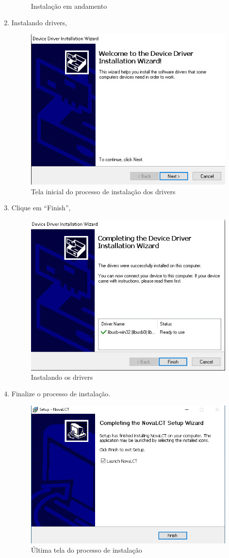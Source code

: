 \documentclass[12pt, a4paper]{article}
\begin{document}
\begin{enumerate}
\begin{figure}[!htb]
			\caption{Instalação em andamento}
		\end{figure}
		\newpage
	\item Instalando drivers,
		\begin{figure}[!htb]
			\centering
			\includegraphics[width=.75\textwidth]{D8.jpeg}
			\caption{Tela inicial do processo de instalação dos drivers}
		\end{figure}
	\item Clique em ``Finish'',
		\begin{figure}[!htb]
			\centering
			\includegraphics[width=.75\textwidth]{D9.jpeg}
			\caption{Instalando os drivers}
		\end{figure}
		\newpage
	\item Finalize o processo de instalação.
		\begin{figure}[!htb]
			\centering
			\includegraphics[width=.8\textwidth]{DEnd.jpeg}
			\caption{Última tela do processo de instalação}
		\end{figure}
\end{enumerate}
\end{document}
